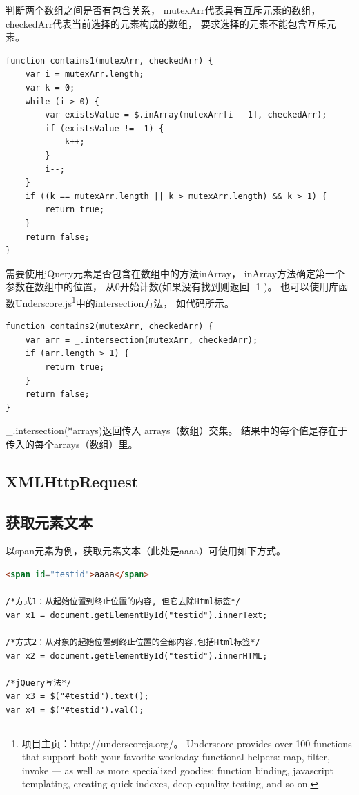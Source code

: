 \documentclass{book}
\begin{document}
判断两个数组之间是否有包含关系，
mutexArr代表具有互斥元素的数组，
checkedArr代表当前选择的元素构成的数组，
要求选择的元素不能包含互斥元素。

\begin{lstlisting}[language=VBScript]
function contains1(mutexArr, checkedArr) {
    var i = mutexArr.length;
    var k = 0;
    while (i > 0) {
        var existsValue = $.inArray(mutexArr[i - 1], checkedArr);
        if (existsValue != -1) {
            k++;
        }
        i--;
    }
    if ((k == mutexArr.length || k > mutexArr.length) && k > 1) {
        return true;
    }
    return false;
}
\end{lstlisting}

需要使用jQuery元素是否包含在数组中的方法inArray，
inArray方法确定第一个参数在数组中的位置，
从0开始计数(如果没有找到则返回 -1 )。
也可以使用库函数Underscore.js\footnote{项目主页：http://underscorejs.org/。
Underscore provides over 100 functions that support both your favorite workaday functional helpers: 
map, filter, invoke — as well as more specialized goodies: function binding, 
javascript templating, creating quick indexes, 
deep equality testing, and so on. }中的intersection方法，
如代码所示。

\begin{lstlisting}[language=VBScript]
function contains2(mutexArr, checkedArr) {        
    var arr = _.intersection(mutexArr, checkedArr);
    if (arr.length > 1) {
        return true;
    }
    return false;
}
\end{lstlisting}

\_.intersection(*arrays)返回传入 arrays（数组）交集。
结果中的每个值是存在于传入的每个arrays（数组）里。

\subsection{XMLHttpRequest}

\subsection{获取元素文本}

以span元素为例，获取元素文本（此处是aaaa）可使用如下方式。

\begin{lstlisting}[language=HTML]
<span id="testid">aaaa</span>

/*方式1：从起始位置到终止位置的内容, 但它去除Html标签*/ 
var x1 = document.getElementById("testid").innerText;

/*方式2：从对象的起始位置到终止位置的全部内容,包括Html标签*/
var x2 = document.getElementById("testid").innerHTML;

/*jQuery写法*/ 
var x3 = $("#testid").text();
var x4 = $("#testid").val();
\end{lstlisting}
\end{document}
